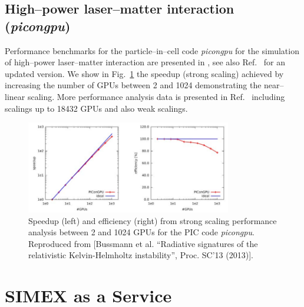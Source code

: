 \documentclass[10pt]{scrartcl}
\begin{document}
\subsection{High--power laser--matter interaction (\textit{picongpu})}
Performance benchmarks for the particle--in--cell code \textit{picongpu} for the
simulation of high--power laser--matter interaction are presented in
\cite{Bussmann2013}, see also Ref.~\cite{Zenker2016} for an updated version. We
show in Fig.~\ref{fig:picongpu_strongscaling} the speedup (strong scaling)
achieved by increasing the number of GPUs between 2 and 1024
demonstrating the near--linear scaling. More performance
analysis data is presented in Ref.~\cite{Bussmann2013} including scalings up to
18432 GPUs and also weak scalings.
\begin{figure}[ht]
  \begin{center}
    \includegraphics[width=0.8\textwidth,angle=0,clip]{figures/picongpu_strongscaling}
  \end{center}
  \caption{Speedup (left) and efficiency (right) from strong scaling performance
    analysis between 2 and 1024 GPUs for the PIC code
    \textit{picongpu}. Reproduced from [Bussmann et al. ``Radiative signatures
    of the relativistic Kelvin-Helmholtz instability'', Proc. SC'13 (2013)].}
  \label{fig:picongpu_strongscaling}
\end{figure}
%
\FloatBarrier
\section{SIMEX as a Service}
\end{document}
